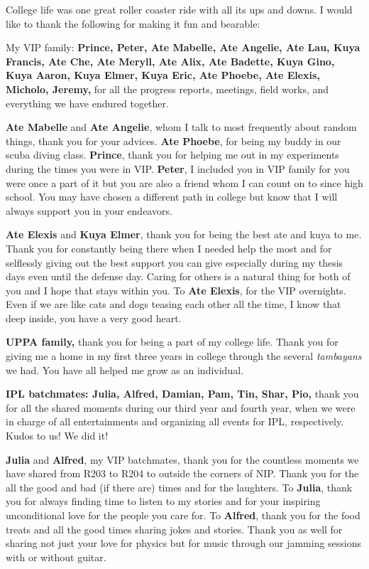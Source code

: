 \setlength{\parskip}{10pt}

College life was one great roller coaster ride with all its ups and downs. I would like to thank the following for making it fun and bearable:

My VIP family: \textbf{Prince, Peter, Ate Mabelle, Ate Angelie, Ate Lau, Kuya Francis, Ate Che, Ate Meryll, Ate Alix, Ate Badette, Kuya Gino, Kuya Aaron, Kuya Elmer, Kuya Eric, Ate Phoebe, Ate Elexis, Micholo, Jeremy,} for all the progress reports, meetings, field works, and everything we have endured together. 

\textbf{Ate Mabelle} and \textbf{Ate Angelie}, whom I talk to most frequently about random things, thank you for your advices. \textbf{Ate Phoebe}, for being my buddy in our scuba diving class. \textbf{Prince}, thank you for helping me out in my experiments during the times you were in VIP. \textbf{Peter}, I included you in VIP family for you were once a part of it but you are also a friend whom I can count on to since high school. You may have chosen a different path in college but know that I will always support you in your endeavors.

\textbf{Ate Elexis} and \textbf{Kuya Elmer}, thank you for being the best ate and kuya to me. Thank you for constantly being there when I needed help the most and for selflessly giving out the best support you can give especially during my thesis days even until the defense day. Caring for others is a natural thing for both of you and I hope that stays within you. To \textbf{Ate Elexis}, for the VIP overnights. Even if we are like cats and dogs teasing each other all the time, I know that deep inside, you have a very good heart.

\textbf{UPPA family,} thank you for being a part of my college life. Thank you for giving me a home in my first three years in college through the several \textit{tambayans} we had. You have all helped me grow as an individual.

\textbf{IPL batchmates: Julia, Alfred, Damian, Pam, Tin, Shar, Pio,} thank you for all the shared moments during our third year and fourth year, when we were in charge of all entertainments and organizing all events for IPL, respectively. Kudos to us! We did it! 

\textbf{Julia} and \textbf{Alfred}, my VIP batchmates, thank you for the countless moments we have shared from R203 to R204 to outside the corners of NIP. Thank you for the all the good and bad (if there are) times and for the laughters. To \textbf{Julia}, thank you for always finding time to listen to my stories and for your inspiring unconditional love for the people you care for. To \textbf{Alfred}, thank you for the food treats and all the good times sharing jokes and stories. Thank you as well for sharing not just your love  for physics but for music through our jamming sessions with or without guitar.

